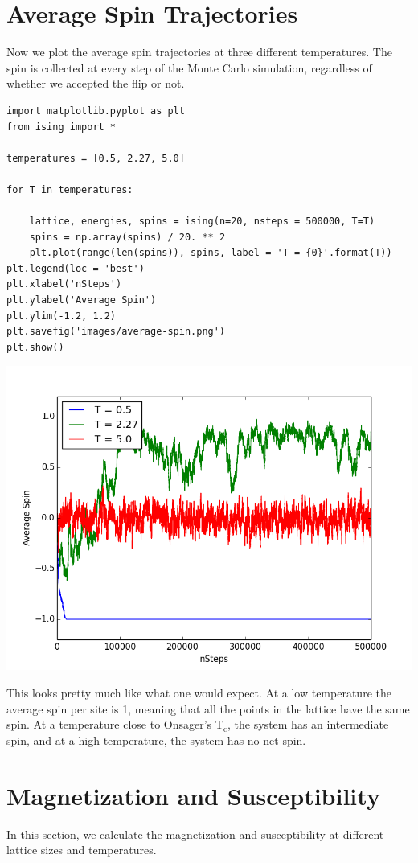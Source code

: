 \documentclass{article}
\begin{document}
\section{Average Spin Trajectories}
\label{sec-4}

Now we plot the average spin trajectories at three different temperatures. The spin is collected at every step of the Monte Carlo simulation, regardless of whether we accepted the flip or not.

\begin{verbatim}
import matplotlib.pyplot as plt
from ising import *

temperatures = [0.5, 2.27, 5.0]

for T in temperatures:

    lattice, energies, spins = ising(n=20, nsteps = 500000, T=T)
    spins = np.array(spins) / 20. ** 2
    plt.plot(range(len(spins)), spins, label = 'T = {0}'.format(T))
plt.legend(loc = 'best')
plt.xlabel('nSteps')
plt.ylabel('Average Spin')
plt.ylim(-1.2, 1.2)
plt.savefig('images/average-spin.png')
plt.show()
\end{verbatim}

\includegraphics[width=.9\linewidth]{./images/average-spin.png}

This looks pretty much like what one would expect. At a low temperature the average spin per site is 1, meaning that all the points in the lattice have the same spin. At a temperature close to Onsager's T$_{\text{c}}$, the system has an intermediate spin, and at a high temperature, the system has no net spin. 



\section{Magnetization and Susceptibility}
\label{sec-5}
In this section, we calculate the magnetization and susceptibility at different lattice sizes and temperatures. 
\end{document}

